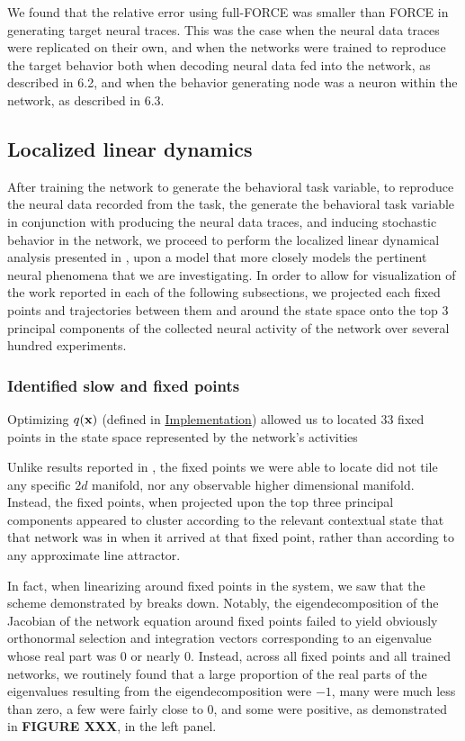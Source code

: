 \documentclass[12pt,a4paper,final]{iopart}
\begin{document}
We found that the relative error using full-FORCE was smaller than FORCE in generating target neural traces. This was the case when the neural data traces were replicated on their own, and when the networks were trained to reproduce the target behavior both when decoding neural data fed into the network, as described in 6.2, and when the behavior generating node was a neuron within the network, as described in 6.3.

\subsection{Localized linear dynamics}
After training the network to generate the behavioral task variable, to reproduce the neural data recorded from the task, the generate the behavioral task variable in conjunction with producing the neural data traces, and inducing stochastic behavior in the network, we proceed to perform the localized linear dynamical analysis presented in \cite{BarakSussillo}, upon a model that more closely models the pertinent neural phenomena that we are investigating. In order to allow for visualization of the work reported in each of the following subsections, we projected each fixed points and trajectories between them and around the state space onto the top $3$ principal components of the collected neural activity of the network over several hundred experiments.

\subsubsection{Identified slow and fixed points}
Optimizing $q({\bf x})$ (defined in \hyperref[sec:imp]{Implementation}) allowed us to located $33$ fixed points in the state space represented by the network's activities

Unlike results reported in \cite{BarakSussillo, Mante2013, BarakSussillo13}, the fixed points we were able to locate did not tile any specific $2d$ manifold, nor any observable higher dimensional manifold. Instead, the fixed points, when projected upon the top three principal components appeared to cluster according to the relevant contextual state that that network was in when it arrived at that fixed point, rather than according to any approximate line attractor.

In fact, when linearizing around fixed points in the system, we saw that the scheme demonstrated by \cite{BarakSussillo, Mante2013} breaks down. Notably, the eigendecomposition of the Jacobian of the network equation around fixed points failed to yield obviously orthonormal selection and integration vectors corresponding to an eigenvalue whose real part was $0$ or nearly $0$. Instead, across all fixed points and all trained networks, we routinely found that a large proportion of the real parts of the eigenvalues resulting from the eigendecomposition were $-1$, many were much less than zero, a few were fairly close to $0$, and some were positive, as demonstrated in \textbf{FIGURE XXX}, in the left panel.
\end{document}
